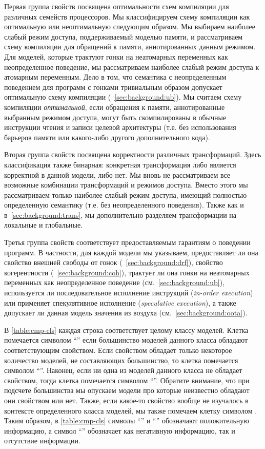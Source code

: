 Первая группа свойств посвящена оптимальности схем компиляции 
для различных семейств  процессоров. 
Мы классифицируем схему компиляции как оптимальную 
или неоптимальную следующим образом. 
Мы выбираем наиболее слабый режим доступа, 
поддерживаемый моделью памяти, и рассматриваем 
схему компиляции для обращений к памяти, аннотированных данным режимом. 
Для моделей, которые трактуют гонки на неатомарных переменных 
как неопределенное поведение, 
мы рассматриваем наиболее слабый режим доступа к атомарным переменным. 
Дело в том, что семантика с неопределенным поведением 
для программ с гонками тривиальным образом допускает 
оптимальную схему компиляции (\see~\cref{sec:background:ub}).
Мы считаем схему компиляции \emph{оптимальной}, 
если обращения к памяти, аннотированные выбранным режимом доступа, 
могут быть скомпилированы в обычные инструкции чтения 
и записи целевой архитектуры 
(т.е. без использования барьеров памяти или какого-либо другого дополнительного кода).

Вторая группа свойств посвящена корректности различных трансформаций. 
Здесь классификация также бинарная: конкретная трансформация 
либо является корректной в данной модели, либо нет. 
Мы вновь не рассматриваем все возможные комбинации 
трансформаций и режимов доступа. 
Вместо этого мы рассматриваем только наиболее слабый режим доступа,
имеющий полностью определенную семантику (т.е. без неопределенного поведения).
Также как и в~\cref{sec:background:trans}, мы дополнительно 
разделяем трансформации на локальные и глобальные. 

Третья группа свойств соответствует предоставляемым гарантиям
о поведении программ. В частности, для каждой модели
мы указываем, предоставляет ли она свойство 
внешней свободы от гонок \eDRF (\see~\cref{sec:background:drf}),
свойство когерентности (\see~\cref{sec:background:coh}),
 трактует ли она гонки на неатомарных переменных как неопределенное поведение (см.~\cref{sec:background:ub}),
используется ли последовательное исполнение инструкций (\emph{in-order execution}) 
или применяет спекулятивное исполнение (\emph{speculative execution}),
а также допускает ли данная модель значения из воздуха (см.~\cref{sec:background:oota}).

В \cref{table:cmp-cls} каждая строка соответствует целому классу моделей. 
Клетка помечается символом ``\cmark\xspace'' если большинство моделей 
данного класса обладают соответствующим свойством. 
Если свойством обладает только некоторое количество моделей, 
не составляющих большинство, то клетка помечается символом ``\wmark\xspace''.
Наконец, если ни одна из моделей данного класса не обладает свойством, 
тогда клетка помечается символом ``\xmark\xspace''.
Обратите внимание, что при подсчете большинства 
мы опускаем модели про которые неизвестно обладают 
они свойством или нет. 
Также, если какое-то свойство вообще не изучалось 
в контексте определенного класса моделей, 
мы также помечаем клетку символом \xmark. 
Таким образом, в \cref{table:cmp-cls} символы ``\cmark\xspace'' и ``\wmark\xspace'' 
обозначают положительную информацию, а символ ``\xmark\xspace'' обозначает 
как негативную информацию, так и отсутствие информации. 

